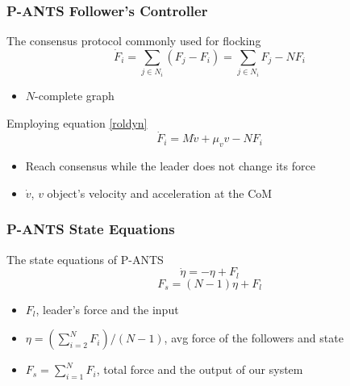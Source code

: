 \documentclass{beamer}
\begin{document}
\begin{frame}
\frametitle{P-ANTS Follower's Controller}
The consensus protocol commonly used for flocking
\begin{equation}\label{pants}
\dot{F}_i=\sum_{j \in N_i} (F_j - F_i)=\sum_{j \in N_i}F_j-NF_i
\end{equation}
\begin{itemize}
\item $N$-complete graph
\end{itemize}
Employing equation \ref{roldyn} 
\begin{equation}\label{pantsdyn}
\dot{F}_i=M\dot{v}+\mu_v v-NF_i
\end{equation} 
\begin{itemize}
\item Reach consensus while the leader does not change its force
\item $\dot{v}$, $v$ object's velocity and acceleration at the CoM
\end{itemize}
\end{frame}

\begin{frame}
\frametitle{P-ANTS State Equations}
The state equations of P-ANTS
\begin{equation}
\dot{\eta}=-\eta+F_l
\end{equation}
\begin{equation}
F_s=(N-1)\eta+F_l
\end{equation}
\begin{itemize}
\item $F_l$, leader's force and the input
\item $\eta=(\sum_{i=2}^{N}F_i)/(N-1)$, avg force of the followers and state
\item $F_s=\sum_{i=1}^N F_i$, total force and the output of our system
\end{itemize}
\end{frame}

\end{document}
